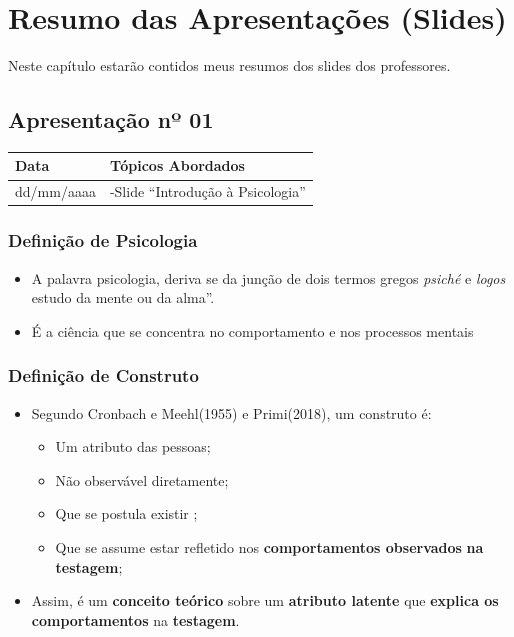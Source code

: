 \documentclass[
]{book}
\providecommand{\tightlist}{%
  \setlength{\itemsep}{0pt}\setlength{\parskip}{0pt}}
\begin{document}
\hypertarget{resumo-das-apresentauxe7uxf5es-slides}{%
\chapter{Resumo das Apresentações (Slides)}\label{resumo-das-apresentauxe7uxf5es-slides}}

Neste capítulo estarão contidos meus resumos dos slides dos professores.

\hypertarget{apresentauxe7uxe3o-nuxba-01}{%
\section{Apresentação nº 01}\label{apresentauxe7uxe3o-nuxba-01}}

\begin{longtable}[]{@{}ll@{}}
\toprule()
Data & Tópicos Abordados \\
\midrule()
\endhead
dd/mm/aaaa & -Slide ``Introdução à Psicologia'' \\
\bottomrule()
\end{longtable}

\hypertarget{definiuxe7uxe3o-de-psicologia}{%
\subsection{Definição de Psicologia}\label{definiuxe7uxe3o-de-psicologia}}

\begin{itemize}
\tightlist
\item
  A palavra psicologia, deriva se da junção de dois termos gregos \emph{psiché} e \emph{logos} estudo da mente ou da alma''.
\item
  É a ciência que se concentra no comportamento e nos processos mentais
\end{itemize}

\hypertarget{definiuxe7uxe3o-de-construto}{%
\subsection{Definição de Construto}\label{definiuxe7uxe3o-de-construto}}

\begin{itemize}
\tightlist
\item
  Segundo Cronbach e Meehl(1955) e Primi(2018), um construto é:

  \begin{itemize}
  \tightlist
  \item
    Um atributo das pessoas;
  \item
    Não observável diretamente;
  \item
    Que se postula existir ;
  \item
    Que se assume estar refletido nos \textbf{comportamentos observados} \textbf{na testagem};
  \end{itemize}
\item
  Assim, é um \textbf{conceito teórico} sobre um \textbf{atributo latente} que \textbf{explica os comportamentos} na \textbf{testagem}.
\end{itemize}
\end{document}
